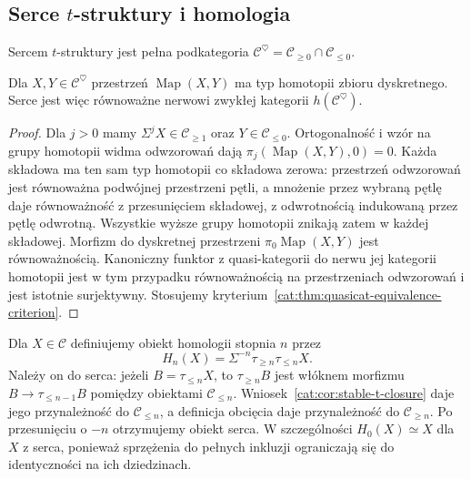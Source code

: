 \subsection{Serce \texorpdfstring{$t$}{t}-struktury i homologia}

\begin{definicja}[Serce]\label{cat:def:stable-t-heart}
Sercem $t$-struktury jest pełna podkategoria $\mathcal C^\heartsuit=\mathcal C_{\geq0}\cap\mathcal C_{\leq0}$.
\end{definicja}

\begin{stwierdzenie}\label{cat:prop:stable-heart-discrete}
Dla $X,Y\in\mathcal C^\heartsuit$ przestrzeń $\operatorname{Map}(X,Y)$ ma typ homotopii zbioru dyskretnego. Serce jest więc równoważne nerwowi zwykłej kategorii $h(\mathcal C^\heartsuit)$.
\end{stwierdzenie}
\begin{proof}
Dla $j>0$ mamy $\Sigma^j X\in\mathcal C_{\geq1}$ oraz $Y\in\mathcal C_{\leq0}$. Ortogonalność i wzór na grupy homotopii widma odwzorowań dają $\pi_j(\operatorname{Map}(X,Y),0)=0$. Każda składowa ma ten sam typ homotopii co składowa zerowa: przestrzeń odwzorowań jest równoważna podwójnej przestrzeni pętli, a mnożenie przez wybraną pętlę daje równoważność z przesunięciem składowej, z odwrotnością indukowaną przez pętlę odwrotną. Wszystkie wyższe grupy homotopii znikają zatem w każdej składowej. Morfizm do dyskretnej przestrzeni $\pi_0\operatorname{Map}(X,Y)$ jest równoważnością. Kanoniczny funktor z quasi-kategorii do nerwu jej kategorii homotopii jest w tym przypadku równoważnością na przestrzeniach odwzorowań i jest istotnie surjektywny. Stosujemy kryterium~\ref{cat:thm:quasicat-equivalence-criterion}.
\end{proof}

Dla $X\in\mathcal C$ definiujemy obiekt homologii stopnia $n$ przez
\[
 H_n(X)=\Sigma^{-n}\tau_{\geq n}\tau_{\leq n}X.
\]
Należy on do serca: jeżeli $B=\tau_{\leq n}X$, to $\tau_{\geq n}B$ jest włóknem morfizmu $B\to\tau_{\leq n-1}B$ pomiędzy obiektami $\mathcal C_{\leq n}$. Wniosek~\ref{cat:cor:stable-t-closure} daje jego przynależność do $\mathcal C_{\leq n}$, a definicja obcięcia daje przynależność do $\mathcal C_{\geq n}$. Po przesunięciu o $-n$ otrzymujemy obiekt serca. W szczególności $H_0(X)\simeq X$ dla $X$ z serca, ponieważ sprzężenia do pełnych inkluzji ograniczają się do identyczności na ich dziedzinach.

